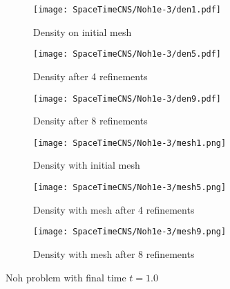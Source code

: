 \documentclass[Dissertation.tex]{subfiles}
\begin{document}
\begin{figure}[p]
\centering
\begin{subfigure}[c]{0.3\textwidth}
\centering
\texttt{[image: SpaceTimeCNS/Noh1e-3/den1.pdf]}
\caption{Density on initial mesh}
\label{fig:noh_den0}
\end{subfigure}
\begin{subfigure}[c]{0.3\textwidth}
\centering
\texttt{[image: SpaceTimeCNS/Noh1e-3/den5.pdf]}
\caption{Density after 4 refinements}
\label{fig:noh_den4}
\end{subfigure}
\begin{subfigure}[c]{0.3\textwidth}
\centering
\texttt{[image: SpaceTimeCNS/Noh1e-3/den9.pdf]}
\caption{Density after 8 refinements}
\label{fig:noh_den8}
\end{subfigure}
\begin{subfigure}[c]{0.45\textwidth}
\centering
\texttt{[image: SpaceTimeCNS/Noh1e-3/mesh1.png]}
\caption{Density with initial mesh}
\label{fig:noh_mesh0}
\end{subfigure}
\begin{subfigure}[c]{0.45\textwidth}
\centering
\texttt{[image: SpaceTimeCNS/Noh1e-3/mesh5.png]}
\caption{Density with mesh after 4 refinements}
\label{fig:noh_mesh4}
\end{subfigure}
\begin{subfigure}[c]{0.9\textwidth}
\centering
\texttt{[image: SpaceTimeCNS/Noh1e-3/mesh9.png]}
\caption{Density with mesh after 8 refinements}
\label{fig:noh_mesh8}
\end{subfigure}
\caption{Noh problem with final time $t=1.0$}
\label{fig:noh}
\end{figure}
\end{document}
